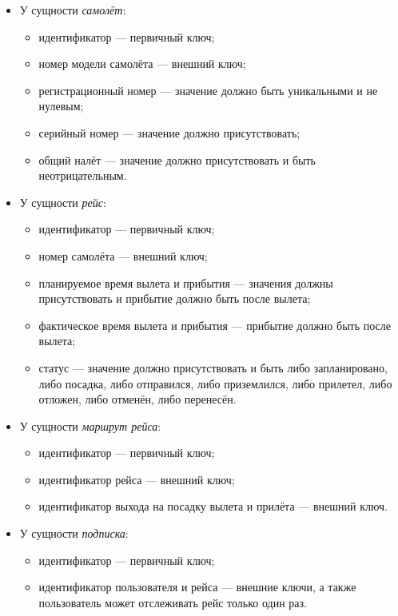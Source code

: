 \begin{itemize}
	\item У сущности \textit{самолёт}:
	\begin{itemize}
		\item идентификатор --- первичный ключ;
		\item номер модели самолёта --- внешний ключ;
		\item регистрационный номер --- значение должно быть уникальными и не нулевым;
		\item серийный номер --- значение должно присутствовать;
		\item общий налёт --- значение должно присутствовать и быть неотрицательным.
	\end{itemize}

	\item У сущности \textit{рейс}:
	\begin{itemize}
		\item идентификатор --- первичный ключ;
		\item номер самолёта --- внешний ключ;
		\item планируемое время вылета и прибытия --- значения должны присутствовать и прибытие должно быть после вылета;
		\item фактическое время вылета и прибытия --- прибытие должно быть после вылета;
		\item статус --- значение должно присутствовать и быть либо запланировано, либо посадка, либо отправился, либо приземлился, либо прилетел, либо отложен, либо отменён, либо перенесён.
	\end{itemize}

	\item У сущности \textit{маршрут рейса}:
	\begin{itemize}
		\item идентификатор --- первичный ключ;
		\item идентификатор рейса --- внешний ключ;
		\item идентификатор выхода на посадку вылета и прилёта --- внешний ключ.
	\end{itemize}

	\item У сущности \textit{подписка}:
	\begin{itemize}
		\item идентификатор --- первичный ключ;
		\item идентификатор пользователя и рейса --- внешние ключи, а также пользователь может отслеживать рейс только один раз.
	\end{itemize}
\end{itemize}

